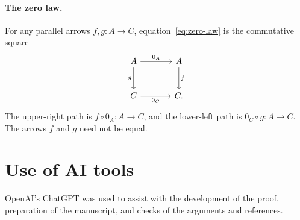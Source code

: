 \documentclass[11pt]{article}
\begin{document}
\paragraph{The zero law.}
For any parallel arrows $f,g:A\to C$,
equation~\eqref{eq:zero-law} is the commutative square
\[
\begin{tikzcd}[column sep=large,row sep=large]
 A\arrow[r,"0_A"]\arrow[d,"g"']&A\arrow[d,"f"]\\
 C\arrow[r,"0_C"']&C.
\end{tikzcd}
\]
The upper-right path is $f\circ0_A:A\to C$, and the lower-left
path is $0_C\circ g:A\to C$. The arrows $f$ and $g$ need not be equal.

\section*{Use of AI tools}
OpenAI's ChatGPT was used to assist with the development of the proof,
preparation of the manuscript, and checks of the arguments and references.
\end{document}
